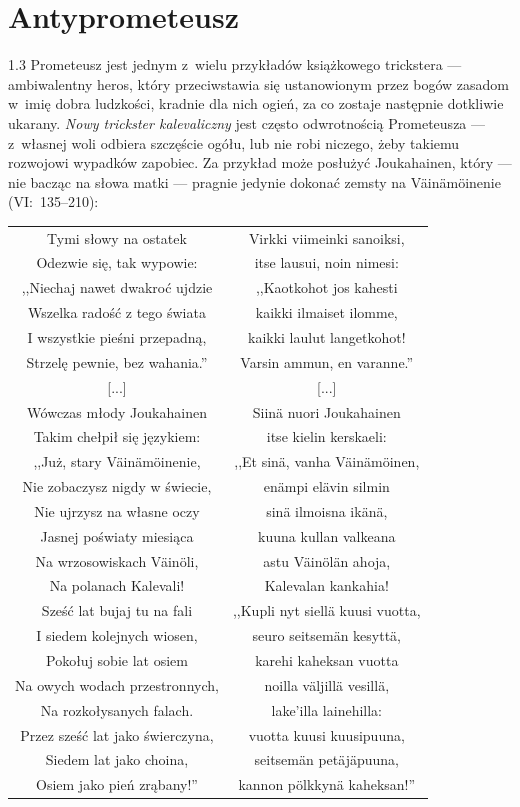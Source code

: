 \documentclass[11pt,a4paper,twoside]{report}
\begin{document}
\section{Antyprometeusz}
\begin{spacing}{1.3}
Prometeusz jest jednym z~wielu przykładów książkowego trickstera --- ambiwalentny heros, który przeciwstawia się ustanowionym przez bogów zasadom w~imię dobra ludzkości, kradnie dla nich ogień, za co zostaje następnie dotkliwie ukarany. \emph{Nowy trickster kalevaliczny} jest często odwrotnością Prometeusza --- z~własnej woli odbiera szczęście ogółu, lub nie robi niczego, żeby takiemu rozwojowi wypadków zapobiec. Za przykład może posłużyć Joukahainen, który --- nie bacząc na słowa matki --- pragnie jedynie dokonać zemsty na Väinämöinenie (VI:~135--210):
\end{spacing}
\newpage
{\centering
\small
\begin{longtable}{c c}
Tymi słowy na ostatek & Virkki viimeinki sanoiksi,\\
Odezwie się, tak wypowie: & itse lausui, noin nimesi: \\
,,Niechaj nawet dwakroć ujdzie & ,,Kaotkohot jos kahesti\\
Wszelka radość z tego świata & kaikki ilmaiset ilomme,\\
I wszystkie pieśni przepadną, & kaikki laulut langetkohot!\\
Strzelę pewnie, bez wahania.'' & Varsin ammun, en varanne.''\\
{[...]} & {[...]}\\
Wówczas młody Joukahainen & Siinä nuori Joukahainen \\
Takim chełpił się językiem: & itse kielin kerskaeli:\\
,,Już, stary Väinämöinenie, & ,,Et sinä, vanha Väinämöinen,\\
Nie zobaczysz nigdy w świecie, & enämpi elävin silmin\\
Nie ujrzysz na własne oczy & sinä ilmoisna ikänä,\\
Jasnej poświaty miesiąca & kuuna kullan valkeana\\
Na wrzosowiskach Väinöli, & astu Väinölän ahoja,\\
Na polanach Kalevali! & Kalevalan kankahia!\\
Sześć lat bujaj tu na fali & ,,Kupli nyt siellä kuusi vuotta,\\
I siedem kolejnych wiosen, & seuro seitsemän kesyttä,\\
Pokołuj sobie lat osiem & karehi kaheksan vuotta\\
Na owych wodach przestronnych, & noilla väljillä vesillä,\\
Na rozkołysanych falach. & lake'illa lainehilla:\\
Przez sześć lat jako świerczyna, & vuotta kuusi kuusipuuna,\\
Siedem lat jako choina, & seitsemän petäjäpuuna,\\
Osiem jako pień zrąbany!'' & kannon pölkkynä kaheksan!''\\
\end{longtable}
}
\end{document}
